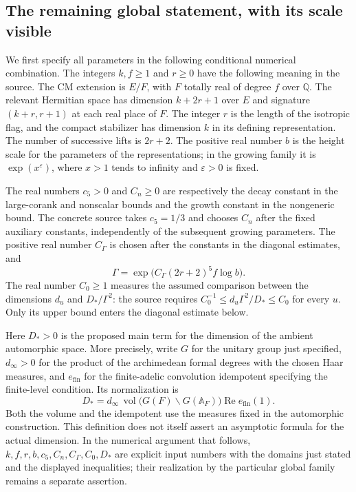 \subsection{The remaining global statement, with its scale visible}

We first specify all parameters in the following conditional numerical
combination.  The integers $k,f\ge1$ and $r\ge0$ have the following
meaning in the source.  The CM extension is $E/F$, with $F$ totally
real of degree $f$ over $\mathbb Q$.  The relevant Hermitian space has
dimension $k+2r+1$ over $E$ and signature $(k+r,r+1)$ at each real
place of $F$.  The integer $r$ is the length of the isotropic flag,
and the compact stabilizer has dimension $k$ in its defining
representation.  The number of successive lifts is $2r+2$.  The
positive real number $b$ is the height scale for the parameters of
the representations; in the growing family it is $\exp(x^\varepsilon)$,
where $x>1$ tends to infinity and $\varepsilon>0$ is fixed.

The real numbers $c_5>0$ and $C_n\ge0$ are respectively the decay
constant in the large-corank and nonscalar bounds and the growth
constant in the nongeneric bound.  The concrete source takes
$c_5=1/3$ and chooses $C_n$ after the fixed auxiliary constants,
independently of the subsequent growing parameters.  The positive
real number $C_\Gamma$ is chosen after the constants in the diagonal
estimates, and
\[
 \Gamma=\exp\bigl(C_\Gamma(2r+2)^5f\log b\bigr).
\]
The real number $C_0\ge1$ measures the assumed comparison between
the dimensions $d_u$ and $D_*/\Gamma^2$: the source requires
$C_0^{-1}\le d_u\Gamma^2/D_*\le C_0$ for every $u$.
Only its upper bound enters the diagonal estimate below.

Here $D_*>0$ is the proposed main term for the dimension of the
ambient automorphic space.  More precisely, write $G$ for the unitary
group just specified, $d_\infty>0$ for the product of the
archimedean formal degrees with the chosen Haar measures, and
$e_{\mathrm{fin}}$ for the finite-adelic convolution idempotent
specifying the finite-level condition.  Its normalization is
\[
 D_*=d_\infty\,
 \operatorname{vol}\bigl(G(F)\backslash G(\mathbb A_F)\bigr)
 \operatorname{Re} e_{\mathrm{fin}}(1).
\]
Both the volume and the idempotent use the measures fixed in the
automorphic construction.  This definition does not itself assert
an asymptotic formula for the actual dimension.  In the numerical
argument that follows, $k,f,r,b,c_5,C_n,C_\Gamma,C_0,D_*$ are explicit
input numbers with the domains just stated and the displayed
inequalities; their realization by the particular global family
remains a separate assertion.

